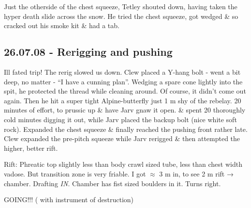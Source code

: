 Just the otherside of the chest squeeze, Tetley shouted down, having
taken the hyper death slide across the snow. He tried the chest squeeze,
got wedged \& so cracked out his smoke kit \& had a tab.


\subsection{26.07.08 - Rerigging and pushing}


Ill fated trip! The rerig slowed us down. Clew placed a Y-hang bolt -
went a bit deep, no matter - ``I have a cunning plan''. Wedging a spare
cone lightly into the spit, he protected the thread while cleaning
around. Of course, it didn't come out again. Then he hit a super tight
Alpine-butterfly just 1 m shy of the rebelay. 20 minutes of effort, to
prussic up \& have Jarv gnaw it open.  \& spent 20 thoroughly cold minutes digging it out, while Jarv
placed the backup bolt (nice white soft rock). Expanded the chest
squeeze \& finally reached the pushing front rather late. Clew expanded
the pre-pitch squeeze while Jarv rerigged \& then attempted the higher,
better rift.

Rift: Phreatic top slightly less than body crawl sized tube, less than
chest width vadose. But transition zone is very friable. I got
$\approx$ 3 m in, to see 2 m rift → chamber. Drafting \emph{IN}.
Chamber has fist sized boulders in it. Turns right.

GOING!!! ( with instrument of destruction)



